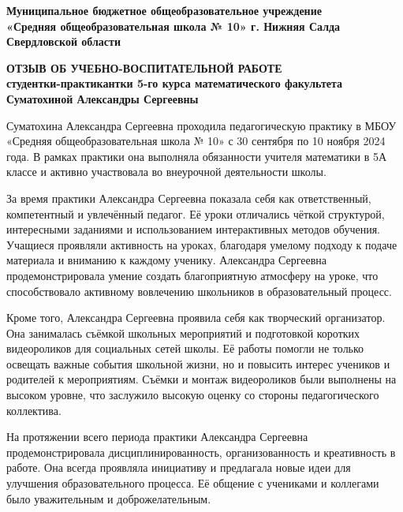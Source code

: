 \documentclass[a4paper,12pt]{article}
\begin{document}
\begin{center}
\textbf{Муниципальное бюджетное общеобразовательное учреждение}\\
\textbf{«Средняя общеобразовательная школа № 10» г. Нижняя Салда Свердловской области}\\
\end{center}

\begin{center}
\textbf{\large ОТЗЫВ ОБ УЧЕБНО-ВОСПИТАТЕЛЬНОЙ РАБОТЕ}\\
\textbf{студентки-практикантки 5-го курса математического факультета}\\
\textbf{Суматохиной Александры Сергеевны}
\end{center}

\vspace{10mm}

Суматохина Александра Сергеевна проходила педагогическую практику в МБОУ «Средняя общеобразовательная школа № 10» с 30 сентября по 10 ноября 2024 года. В рамках практики она выполняла обязанности учителя математики в 5А классе и активно участвовала во внеурочной деятельности школы.

За время практики Александра Сергеевна показала себя как ответственный, компетентный и увлечённый педагог. Её уроки отличались чёткой структурой, интересными заданиями и использованием интерактивных методов обучения. Учащиеся проявляли активность на уроках, благодаря умелому подходу к подаче материала и вниманию к каждому ученику. Александра Сергеевна продемонстрировала умение создать благоприятную атмосферу на уроке, что способствовало активному вовлечению школьников в образовательный процесс.

Кроме того, Александра Сергеевна проявила себя как творческий организатор. Она занималась съёмкой школьных мероприятий и подготовкой коротких видеороликов для социальных сетей школы. Её работы помогли не только освещать важные события школьной жизни, но и повысить интерес учеников и родителей к мероприятиям. Съёмки и монтаж видеороликов были выполнены на высоком уровне, что заслужило высокую оценку со стороны педагогического коллектива.

На протяжении всего периода практики Александра Сергеевна продемонстрировала дисциплинированность, организованность и креативность в работе. Она всегда проявляла инициативу и предлагала новые идеи для улучшения образовательного процесса. Её общение с учениками и коллегами было уважительным и доброжелательным.

\vspace{5mm}
\end{document}
